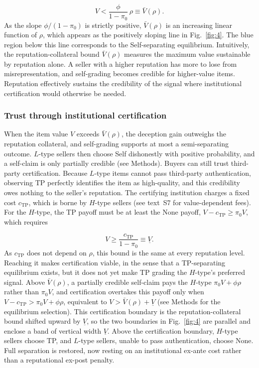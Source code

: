 \documentclass[11pt,letterpaper]{article}
\theoremstyle{definition}
\begin{document}
\begin{equation}
V < \frac{\phi}{1-\pi_0}\,\rho \equiv \bar{V}(\rho).
\label{eq:vbar}
\end{equation}
As the slope $\phi/(1-\pi_0)$ is strictly positive, $\bar{V}(\rho)$ is an increasing linear function of $\rho$, which appears as the positively sloping line in Fig.~\ref{fig:4}. The blue region below this line corresponds to the Self-separating equilibrium. Intuitively, the reputation-collateral bound $\bar{V}(\rho)$ measures the maximum value sustainable by reputation alone. A seller with a higher reputation has more to lose from misrepresentation, and self-grading becomes credible for higher-value items. Reputation effectively sustains the credibility of the signal where institutional certification would otherwise be needed.

\subsubsection*{Trust through institutional certification}

When the item value $V$ exceeds $\bar{V}(\rho)$, the deception gain outweighs the reputation collateral, and self-grading supports at most a semi-separating outcome. $L$-type sellers then choose Self dishonestly with positive probability, and a self-claim is only partially credible (see Methods). Buyers can still trust third-party certification. Because $L$-type items cannot pass third-party authentication, observing TP perfectly identifies the item as high-quality, and this credibility owes nothing to the seller's reputation. The certifying institution charges a fixed cost $c_{\text{TP}}$, which is borne by $H$-type sellers (see text~S7 for value-dependent fees). For the $H$-type, the TP payoff must be at least the None payoff, $V - c_{\text{TP}} \geq \pi_0 V$, which requires

\begin{equation}
V \geq \frac{c_{\text{TP}}}{1-\pi_0} \equiv \underline{V}.
\label{eq:vunderline}
\end{equation}
As $c_{\text{TP}}$ does not depend on $\rho$, this bound is the same at every reputation level. Reaching it makes certification viable, in the sense that a TP-separating equilibrium exists, but it does not yet make TP grading the $H$-type's preferred signal. Above $\bar{V}(\rho)$, a partially credible self-claim pays the $H$-type $\pi_0 V + \phi\rho$ rather than $\pi_0 V$, and certification overtakes this payoff only when $V - c_{\text{TP}} > \pi_0 V + \phi\rho$, equivalent to $V > \bar{V}(\rho) + \underline{V}$ (see Methods for the equilibrium selection). This certification boundary is the reputation-collateral bound shifted upward by $\underline{V}$, so the two boundaries in Fig.~\ref{fig:4} are parallel and enclose a band of vertical width $\underline{V}$. Above the certification boundary, $H$-type sellers choose TP, and $L$-type sellers, unable to pass authentication, choose None. Full separation is restored, now resting on an institutional ex-ante cost rather than a reputational ex-post penalty.
\end{document}
